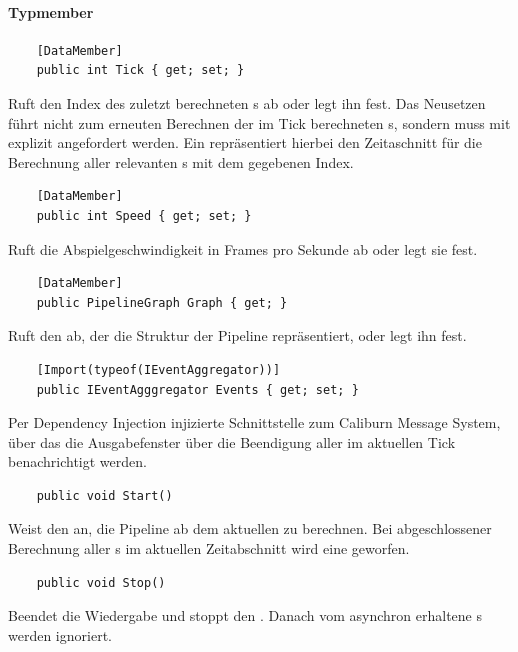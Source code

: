 \paragraph{Typmember}
\begin{itemize}

	\begin{verbatim}
	[DataMember]
	public int Tick { get; set; }
	\end{verbatim}
	Ruft den Index des zuletzt berechneten s ab oder legt ihn fest. Das Neusetzen führt nicht zum erneuten Berechnen der im Tick berechneten s, sondern muss mit  explizit angefordert werden. Ein  repräsentiert hierbei den Zeitaschnitt für die Berechnung aller relevanten s mit dem gegebenen Index.

	\begin{verbatim}
	[DataMember]
	public int Speed { get; set; }
	\end{verbatim}
	Ruft die Abspielgeschwindigkeit in Frames pro Sekunde ab oder legt sie fest.

	\begin{verbatim}
	[DataMember]
	public PipelineGraph Graph { get; }
	\end{verbatim}
	Ruft den  ab, der die Struktur der Pipeline repräsentiert, oder legt ihn fest.

	\begin{verbatim}
	[Import(typeof(IEventAggregator))]
	public IEventAgggregator Events { get; set; }
	\end{verbatim}
	Per Dependency Injection injizierte Schnittstelle zum Caliburn Message System, über das die Ausgabefenster über die Beendigung aller im aktuellen Tick  benachrichtigt werden.



	\begin{verbatim}
	public void Start()
	\end{verbatim}
	Weist den  an, die Pipeline ab dem aktuellen  zu berechnen. Bei abgeschlossener Berechnung aller s im aktuellen Zeitabschnitt wird eine  geworfen.

	\begin{verbatim}
	public void Stop()
	\end{verbatim}
	Beendet die Wiedergabe und stoppt den . Danach vom  asynchron erhaltene s werden ignoriert.
\end{itemize}

